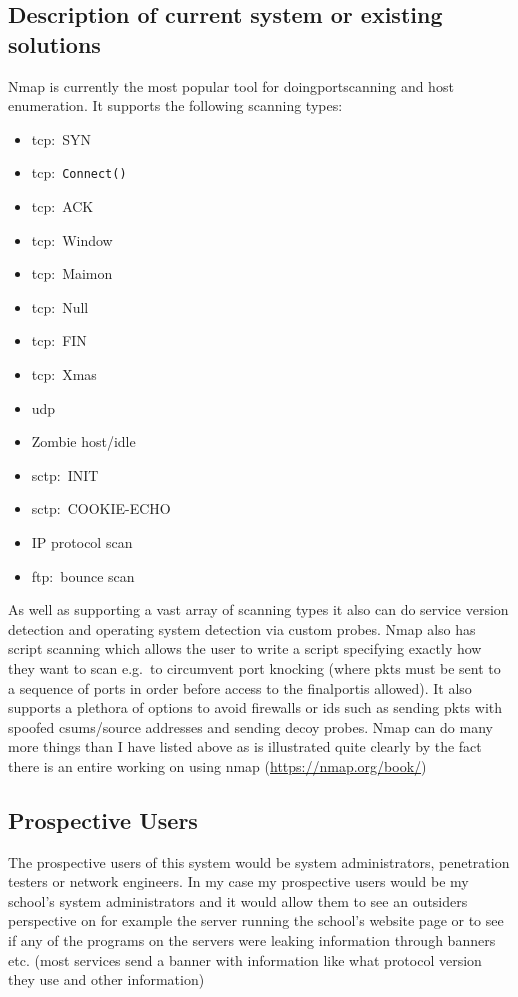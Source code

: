 \documentclass[titlepage]{article}
\let\Oldsubsection\subsection{}
\renewcommand{\subsection}{\FloatBarrier\Oldsubsection}
\begin{document}
\subsection{Description of current system or existing solutions}

Nmap is currently the most popular tool for doing\gls{port}scanning and host enumeration.
It supports the following scanning types:

\begin{itemize}
\item{\gls{tcp}:\ SYN}
\item{\gls{tcp}:\ \verb|Connect()|}
\item{\gls{tcp}:\ ACK}
\item{\gls{tcp}:\ Window}
\item{\gls{tcp}:\ Maimon}
\item{\gls{tcp}:\ Null}
\item{\gls{tcp}:\ FIN}
\item{\gls{tcp}:\ Xmas}
\item{\gls{udp}}
\item{Zombie host/idle}
\item{\gls{sctp}:\ INIT}
\item{\gls{sctp}:\ COOKIE-ECHO}
\item{IP protocol scan}
\item{\gls{ftp}:\ bounce scan}
\end{itemize}

As well as supporting a vast array of scanning types it also can do \gls{service} version detection
and operating system detection via custom probes. Nmap also has script scanning which allows
the user to write a script specifying exactly how they want to scan e.g.\ to circumvent \gls{port knocking}
(where \glspl{pkt} must be sent to a sequence of \glspl{port} in order before access to the final\gls{port}is allowed).
It also supports a plethora of options to avoid firewalls or \gls{ids} such as sending
\glspl{pkt} with spoofed \glspl{csum}/source addresses and sending decoy probes. Nmap can do many more things than I
have listed above as is illustrated quite clearly by the fact there is an entire working on using nmap
(\href{https://nmap.org/book/}{https://nmap.org/book/})

\subsection{Prospective Users}

The prospective users of this system would be system administrators, penetration testers or network engineers.
In my case my prospective users would be my school's system administrators and it would allow them to see an
outsiders perspective on for example the \gls{server} running the school's website page or to see if any of the
programs on the \glspl{server} were leaking information through \glspl{banner} etc. (most \glspl{service} send a \gls{banner} with
information like what protocol version they use and other information)
\end{document}
